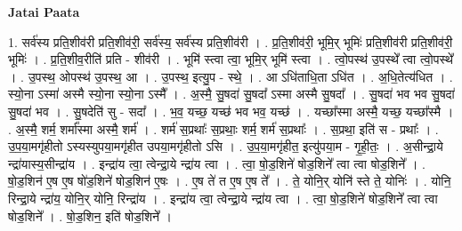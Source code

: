\documentclass[17pt]{extarticle}
\begin{document}
\textbf{Jatai Paata} \newline

1. सर्व॑स्य प्रति॒शीव॑री प्रति॒शीव॑री॒ सर्व॑स्य॒ सर्व॑स्य प्रति॒शीव॑री । . प्र॒ति॒शीव॑री॒ भूमि॒र् भूमिः॑ प्रति॒शीव॑री प्रति॒शीव॑री॒ भूमिः॑ । . प्र॒ति॒शीव॒रीति॑ प्रति - शीव॑री । . भूमि॑ स्त्वा त्वा॒ भूमि॒र् भूमि॑ स्त्वा । . त्वो॒पस्थ॑ उ॒पस्थे᳚ त्वा त्वो॒पस्थे᳚ । . उ॒पस्थ॒ ओपस्थ॑ उ॒पस्थ॒ आ । . उ॒पस्थ॒ इत्यु॒प - स्थे॒ । . आ ऽधि॑ताधि॒ता ऽधि॑त । . अ॒धि॒तेत्य॑धित । . स्यो॒ना ऽस्मा॑ अस्मै स्यो॒ना स्यो॒ना ऽस्मै᳚ । . अ॒स्मै॒ सु॒षदा॑ सु॒षदा᳚ ऽस्मा अस्मै सु॒षदा᳚ । . सु॒षदा॑ भव भव सु॒षदा॑ सु॒षदा॑ भव । . सु॒षदेति॑ सु - सदा᳚ । . भ॒व॒ यच्छ॒ यच्छ॑ भव भव॒ यच्छ॑ । . यच्छा᳚स्मा अस्मै॒ यच्छ॒ यच्छा᳚स्मै । . अ॒स्मै॒ शर्म॒ शर्मा᳚स्मा अस्मै॒ शर्म॑ । . शर्म॑ स॒प्रथाः᳚ स॒प्रथाः॒ शर्म॒ शर्म॑ स॒प्रथाः᳚ । . स॒प्रथा॒ इति॑ स - प्रथाः᳚ । . उ॒प॒या॒मगृ॑हीतो ऽस्यस्युपया॒मगृ॑हीत उपया॒मगृ॑हीतो ऽसि । . उ॒प॒या॒मगृ॑हीत॒ इत्यु॑पया॒म - गृ॒ही॒तः॒ । . अ॒सीन्द्रा॒ये न्द्रा॑यास्य॒सीन्द्रा॑य । . इन्द्रा॑य त्वा॒ त्वेन्द्रा॒ये न्द्रा॑य त्वा । . त्वा॒ षो॒ड॒शिने॑ षोड॒शिने᳚ त्वा त्वा षोड॒शिने᳚ । . षो॒ड॒शिन॑ ए॒ष ए॒ष षो॑ड॒शिने॑ षोड॒शिन॑ ए॒षः । . ए॒ष ते॑ त ए॒ष ए॒ष ते᳚ । . ते॒ योनि॒र् योनि॑ स्ते ते॒ योनिः॑ । . योनि॒ रिन्द्रा॒ये न्द्रा॑य॒ योनि॒र् योनि॒ रिन्द्रा॑य । . इन्द्रा॑य त्वा॒ त्वेन्द्रा॒ये न्द्रा॑य त्वा । . त्वा॒ षो॒ड॒शिने॑ षोड॒शिने᳚ त्वा त्वा षोड॒शिने᳚ । . षो॒ड॒शिन॒ इति॑ षोड॒शिने᳚ । \newline
\end{document}
